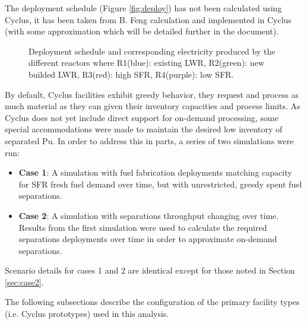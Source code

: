 \documentclass[12pt]{article}
\begin{document}

The deployment schedule (Figure \ref{fig:deploy}) has not been calculated
using Cyclus, it has been taken from B. Feng calculation and implemented in
Cyclus (with some approximation which will be detailed further in the
document).

\begin{figure}[h!]
    \centering
    \caption{
        Deployment schedule and corresponding electricity produced by the
        different reactors where R1(blue): existing LWR, R2(green): new
        builded LWR, R3(red): high SFR, R4(purple): low
        SFR.\label{fig:deployment}
    }
\end{figure}

By default, Cyclus facilities exhibit greedy behavior, they request and
process as much material as they can given their inventory capacities and
process limits. As Cyclus does not yet include direct support for on-demand
processing, some special accommodations were made to maintain the desired low
inventory of separated Pu. In order to address this in parts, a series of two
simulations were run:

\begin{itemize}

    \item \textbf{Case 1}: A simulation with fuel fabrication deployments
        matching capacity for SFR fresh fuel demand over time, but with
        unrestricted, greedy spent fuel separations.

    \item \textbf{Case 2}: A simulation with separations throughput changing
        over time. Results from the first simulation were used to calculate
        the required separations deployments over time in order to approximate
        on-demand separations.

\end{itemize}

Scenario details for cases 1 and 2 are identical except for those noted in
Section \ref{sec:case2}.

The following subsections describe the configuration of the primary facility
types (i.e. Cyclus prototypes) used in this analysis.
\end{document}
